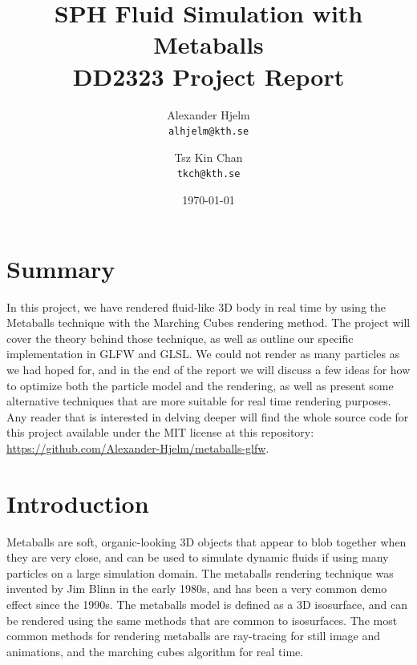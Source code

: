 \documentclass{article}
\begin{document}
    \title{%
    	\textbf{SPH Fluid Simulation with Metaballs} \\
    	\large DD2323 Project Report \\}
   
	\author{
		Alexander Hjelm\\
		\texttt{alhjelm@kth.se}
		\and
		Tsz Kin Chan\\
		\texttt{tkch@kth.se}
	}

    \date{\today}

    \maketitle
    
    \begin{multicols}{2}

    \section{Summary}
        In this project, we have rendered fluid-like 3D body in real time by using the Metaballs technique with the Marching Cubes rendering method. The project will cover the theory behind those technique, as well as outline our specific implementation in GLFW and GLSL. We could not render as many particles as we had hoped for, and in the end of the report we will discuss a few ideas for how to optimize both the particle model and the rendering, as well as present some alternative techniques that are more suitable for real time rendering purposes. Any reader that is interested in delving deeper will find the whole source code for this project available under the MIT license at this repository: \url{https://github.com/Alexander-Hjelm/metaballs-glfw}.
    
    \section{Introduction}

    Metaballs are soft, organic-looking 3D objects that appear to blob together when they are very close, and can be used to simulate dynamic fluids if using many particles on a large simulation domain. 
    The metaballs rendering technique was invented by Jim Blinn in the early 1980s, and has been a very common demo effect since the 1990s.
    The metaballs model is defined as a 3D isosurface, and can be rendered using the same methods that are common to isosurfaces.
    The most common methods for rendering metaballs are ray-tracing for still image and animations, and the marching cubes algorithm for real time.
    \cite{heckbert92}


\end{multicols}
\end{document}
